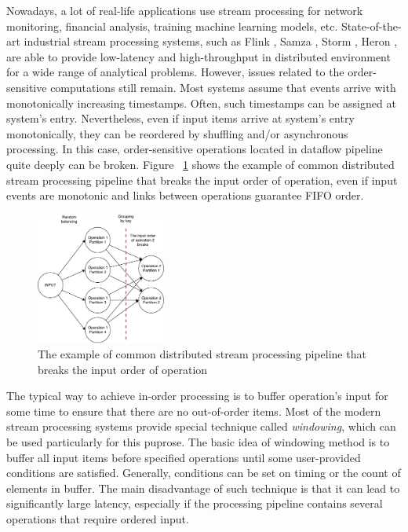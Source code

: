 
\label {fs-intro}

Nowadays, a lot of real-life applications use stream processing for network monitoring, financial analysis, training machine learning models, etc. State-of-the-art industrial stream processing systems, such as Flink \cite{carbone2015apache}, Samza \cite{Noghabi:2017:SSS:3137765.3137770}, Storm \cite{apache:storm}, Heron \cite{Kulkarni:2015:THS:2723372.2742788}, are able to provide low-latency and high-throughput in distributed environment for a wide range of analytical problems. However, issues related to the order-sensitive computations still remain. Most systems assume that events arrive with monotonically increasing timestamps. Often, such timestamps can be assigned at system's entry. Nevertheless, even if input items arrive at system's entry monotonically, they can be reordered by shuffling and/or asynchronous processing. In this case, order-sensitive operations located in dataflow pipeline quite deeply can be broken. Figure ~\ref{break-order-dataflow} shows the example of common distributed stream processing pipeline that breaks the input order of operation, even if input events are monotonic and links between operations guarantee FIFO order.

\begin{figure}[htbp]
  \centering
  \includegraphics[width=0.38\textwidth]{pics/break_order_pipeline}
  \caption{The example of common distributed stream processing pipeline that breaks the input order of operation}
  \label {break-order-dataflow}
\end{figure}

The typical way to achieve in-order processing is to buffer operation's input for some time to ensure that there are no out-of-order items. Most of the modern stream processing systems provide special technique called {\it windowing}, which can be used particularly for this puprose. The basic idea of windowing method is to buffer all input items before specified operations until some user-provided conditions are satisfied. Generally, conditions can be set on timing or the count of elements in buffer. The main disadvantage of such technique is that it can lead to significantly large latency, especially if the processing pipeline contains several operations that require ordered input. 

